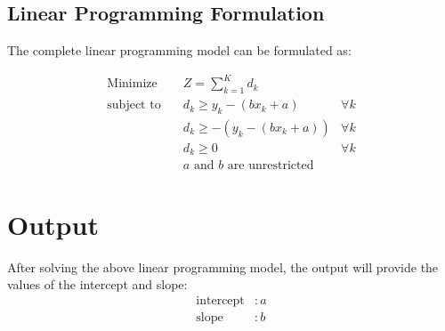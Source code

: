 \documentclass{article}
\begin{document}
\subsection*{Linear Programming Formulation}
The complete linear programming model can be formulated as:

\[
\begin{align*}
\text{Minimize} & \quad Z = \sum_{k=1}^{K} d_k \\
\text{subject to} & \quad d_k \geq y_k - (bx_k + a) & \forall k \\
& \quad d_k \geq -(y_k - (bx_k + a)) & \forall k \\
& \quad d_k \geq 0 & \forall k \\
& \quad a \text{ and } b \text{ are unrestricted}
\end{align*}
\]

\section*{Output}
After solving the above linear programming model, the output will provide the values of the intercept and slope:
\[
\begin{align*}
\text{intercept} & : a \\
\text{slope} & : b
\end{align*}
\]
\end{document}

